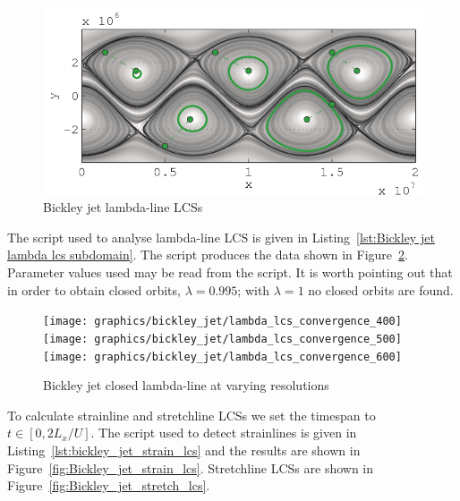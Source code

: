 \documentclass{article}
\begin{document}
\begin{figure}
  \centering
  \includegraphics[width=.85\textwidth]{graphics/bickley_jet/lambda_lcs_full}
  \caption{Bickley jet lambda-line LCSs}
  \label{fig:Bickley_jet_lambda_LCS_full}
\end{figure}

The script used to analyse lambda-line LCS is given in Listing~\ref{lst:Bickley jet lambda lcs subdomain}. The script produces the data shown in Figure~\ref{fig:Bickley jet lambda lcs convergence}. Parameter values used may be read from the script. It is worth pointing out that in order to obtain closed orbits, $\lambda = 0.995$; with $\lambda = 1$ no closed orbits are found.



\begin{figure}[hbt]
  \centering
  \texttt{[image: graphics/bickley\_jet/lambda\_lcs\_convergence\_400]}
\texttt{[image: graphics/bickley\_jet/lambda\_lcs\_convergence\_500]}
\texttt{[image: graphics/bickley\_jet/lambda\_lcs\_convergence\_600]}
  \caption{Bickley jet closed lambda-line at varying resolutions}
  \label{fig:Bickley jet lambda lcs convergence}
\end{figure}

To calculate strainline and stretchline LCSs we set the timespan to $t \in [0,2L_x/U]$. The script used to detect strainlines is given in Listing~\ref{lst:bickley_jet_strain_lcs} and the results are shown in Figure~\ref{fig:Bickley_jet_strain_lcs}. Stretchline LCSs are shown in Figure~\ref{fig:Bickley_jet_stretch_lcs}.


\end{document}

